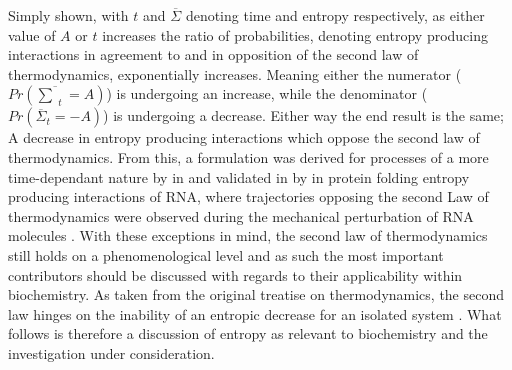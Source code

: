Simply shown, with $t$ and $\overline{\Sigma}$ denoting time and entropy respectively, as either value of $A$ or $t$ increases the ratio of probabilities, denoting entropy producing interactions in agreement to and in opposition of the second law of thermodynamics, exponentially increases. Meaning either the numerator ($Pr\left(\overline{\sum}_{t}=A\right)$) is undergoing an increase, while the denominator ($Pr\left(\overline{\Sigma}_{t}=-A\right)$) is undergoing a decrease. Either way the end result is the same; A decrease in entropy producing interactions which oppose the second law of thermodynamics.  
 From this, a formulation was derived for processes of a more time-dependant nature by \citeauthor{Crooks1999} in \citeyear{Crooks1999} and validated in \citeyear{Kasner2013} by \citeauthor{Kasner2013} in protein folding entropy producing interactions of RNA, where trajectories opposing the second Law of thermodynamics were observed during the mechanical perturbation of RNA molecules \cite{Crooks1999,Kasner2013}. With these exceptions in mind, the second law of thermodynamics still holds on a phenomenological level and as such the most important contributors should be discussed with regards to their applicability within biochemistry. As taken from the original treatise on thermodynamics, the second law hinges on the inability of an entropic decrease for an isolated system \citep{Planck1905}. What follows is therefore a discussion of entropy as relevant to biochemistry and the investigation under consideration.
 
